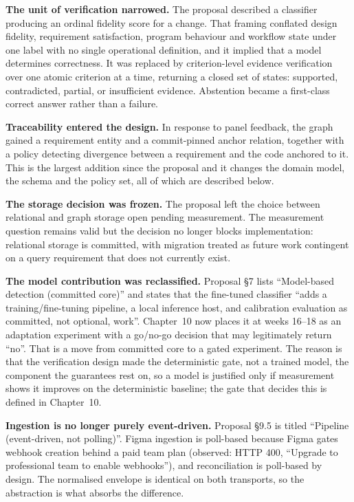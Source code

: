 \textbf{The unit of verification narrowed.} The proposal described a
classifier producing an ordinal fidelity score for a change. That framing
conflated design fidelity, requirement satisfaction, program behaviour and
workflow state under one label with no single operational definition, and it
implied that a model determines correctness. It was replaced by criterion-level
evidence verification over one atomic criterion at a time, returning a closed
set of states: supported, contradicted, partial, or insufficient evidence.
Abstention became a first-class correct answer rather than a failure.

\textbf{Traceability entered the design.} In response to panel feedback, the
graph gained a requirement entity and a commit-pinned anchor relation, together
with a policy detecting divergence between a requirement and the code anchored
to it. This is the largest addition since the proposal and it changes the domain
model, the schema and the policy set, all of which are described below.

\textbf{The storage decision was frozen.} The proposal left the choice between
relational and graph storage open pending measurement. The measurement question
remains valid but the decision no longer blocks implementation: relational
storage is committed, with migration treated as future work contingent on a
query requirement that does not currently exist.

\textbf{The model contribution was reclassified.} Proposal \S7 lists
``Model-based detection (committed core)'' and states that the fine-tuned
classifier ``adds a training/fine-tuning pipeline, a local inference host, and
calibration evaluation as committed, not optional, work''. Chapter~10 now places
it at weeks 16--18 as an adaptation experiment with a go/no-go decision that may
legitimately return ``no''. That is a move from committed core to a gated
experiment. The reason is that the verification design made the deterministic
gate, not a trained model, the component the guarantees rest on, so a model is
justified only if measurement shows it improves on the deterministic baseline;
the gate that decides this is defined in Chapter~10.

\textbf{Ingestion is no longer purely event-driven.} Proposal \S9.5 is titled
``Pipeline (event-driven, not polling)''. Figma ingestion is poll-based because
Figma gates webhook creation behind a paid team plan (observed: HTTP 400,
``Upgrade to professional team to enable webhooks''), and reconciliation is
poll-based by design. The normalised envelope is identical on both transports,
so the abstraction is what absorbs the difference.

